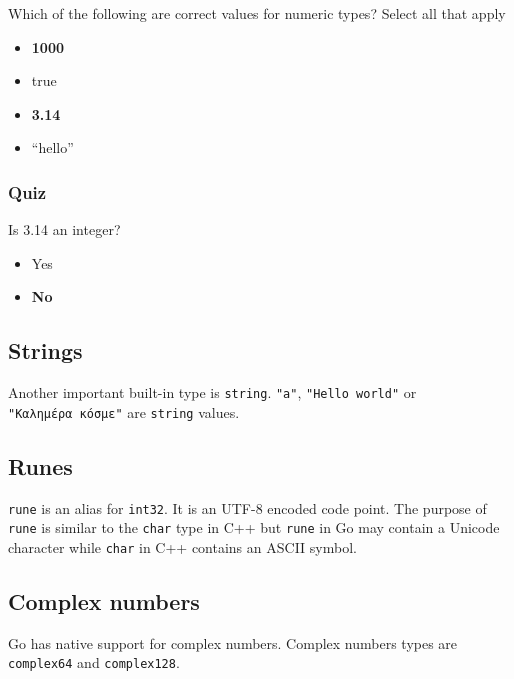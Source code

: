\documentclass[]{book}
\providecommand{\tightlist}{%
  \setlength{\itemsep}{0pt}\setlength{\parskip}{0pt}}
\begin{document}
Which of the following are correct values for numeric types? Select all that apply

\begin{itemize}
\tightlist
\item
  \textbf{1000}
\item
  true
\item
  \textbf{3.14}
\item
  ``hello''
\end{itemize}

\hypertarget{quiz-7}{%
\subsubsection*{Quiz}\label{quiz-7}}

Is 3.14 an integer?

\begin{itemize}
\tightlist
\item
  Yes
\item
  \textbf{No}
\end{itemize}

\hypertarget{strings}{%
\subsection{Strings}\label{strings}}

Another important built-in type is \texttt{string}. \texttt{"a"}, \texttt{"Hello\ world"} or
\texttt{"Καλημέρα\ κόσμε"} are \texttt{string} values.

\hypertarget{runes}{%
\subsection{Runes}\label{runes}}

\texttt{rune} is an alias for \texttt{int32}. It is an UTF-8 encoded code point. The purpose
of \texttt{rune} is similar to the \texttt{char} type in C++ but \texttt{rune} in Go may contain a
Unicode character while \texttt{char} in C++ contains an ASCII symbol.

\hypertarget{complex-numbers}{%
\subsection{Complex numbers}\label{complex-numbers}}

Go has native support for complex numbers. Complex numbers types are
\texttt{complex64} and \texttt{complex128}.
\end{document}
